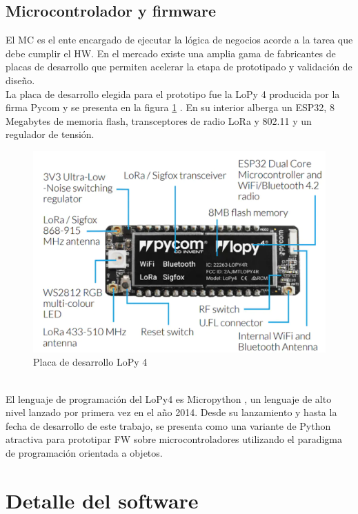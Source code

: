 \subsection{Microcontrolador y firmware}
El MC es el ente encargado de ejecutar la lógica de negocios acorde a la tarea que debe cumplir el HW. En el mercado existe una amplia gama de fabricantes de placas de desarrollo que permiten acelerar la etapa de prototipado y validación de diseño.\\
La placa de desarrollo elegida para el prototipo fue la LoPy 4 producida por la firma Pycom y se presenta en la figura \ref{fig:lopy4} . En su interior alberga un ESP32, 8 Megabytes de memoria flash, transceptores de radio LoRa y 802.11 y un regulador de tensión.\\
\begin{figure}[h]
	\centering
	\includegraphics[width=0.7\linewidth]{Figures/lopy4}
	\caption{Placa de desarrollo LoPy 4 \citep{lopy4}}
	\label{fig:lopy4}
\end{figure}\\
El lenguaje de programación del LoPy4 es Micropython \citep{micropy}, un lenguaje de alto nivel lanzado por primera vez en el año 2014. Desde su lanzamiento y hasta la fecha de desarrollo de este trabajo, se presenta como una variante de Python atractiva para prototipar FW sobre microcontroladores utilizando el paradigma de programación orientada a objetos.\\


\section{Detalle del software}
